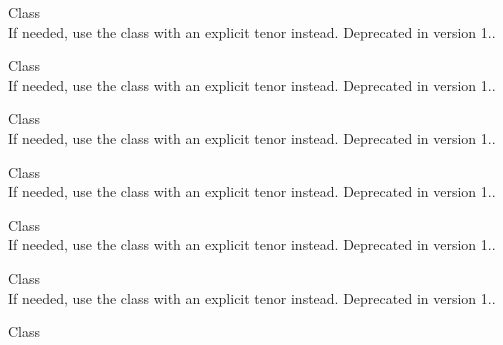 \begin{DoxyRefList}
\item[Class \doxylink{class_quant_lib_1_1_euribor365__5_m}{Quant\+Lib\+::Euribor365\+\_\+5M} ]\hfill \\
\label{deprecated__deprecated000068}%
%
If needed, use the  class with an explicit tenor instead. Deprecated in version 1..  
\item[Class \doxylink{class_quant_lib_1_1_euribor365__6_m}{Quant\+Lib\+::Euribor365\+\_\+6M} ]\hfill \\
\label{deprecated__deprecated000069}%
%
If needed, use the  class with an explicit tenor instead. Deprecated in version 1..  
\item[Class \doxylink{class_quant_lib_1_1_euribor365__7_m}{Quant\+Lib\+::Euribor365\+\_\+7M} ]\hfill \\
\label{deprecated__deprecated000070}%
%
If needed, use the  class with an explicit tenor instead. Deprecated in version 1..  
\item[Class \doxylink{class_quant_lib_1_1_euribor365__8_m}{Quant\+Lib\+::Euribor365\+\_\+8M} ]\hfill \\
\label{deprecated__deprecated000071}%
%
If needed, use the  class with an explicit tenor instead. Deprecated in version 1..  
\item[Class \doxylink{class_quant_lib_1_1_euribor365__9_m}{Quant\+Lib\+::Euribor365\+\_\+9M} ]\hfill \\
\label{deprecated__deprecated000072}%
%
If needed, use the  class with an explicit tenor instead. Deprecated in version 1..  
\item[Class \doxylink{class_quant_lib_1_1_euribor365___s_w}{Quant\+Lib\+::Euribor365\+\_\+\+SW} ]\hfill \\
\label{deprecated__deprecated000061}%
%
If needed, use the  class with an explicit tenor instead. Deprecated in version 1..  
\item[Class \doxylink{class_quant_lib_1_1_euribor3_w}{Quant\+Lib\+::Euribor3W} ]\hfill \\

\end{DoxyRefList}
